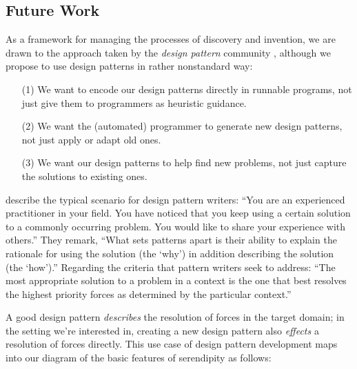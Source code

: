 \subsection{Future Work} \label{sec:futurework} \label{sec:hatching}

As a framework for managing the processes of discovery and invention,
we are drawn to the approach taken by the \emph{design pattern}
community \cite{alexander1999origins}, although we
propose to use design patterns in rather nonstandard way:
\begin{itemize}
\item[(1)] We want to encode our design patterns directly in runnable
  programs, not just give them to programmers as heuristic guidance.
\item[(2)] We want the (automated) programmer to generate new design
  patterns, not just apply or adapt old ones.
\item[(3)] We want our design patterns to help find new problems,
  not just capture the solutions to existing ones.
\end{itemize}

 describe the typical scenario for design
pattern writers: ``You are an experienced practitioner in your
field. You have noticed that you keep using a certain solution to a
commonly occurring problem. You would like to share your experience
with others.''  They remark, ``What sets patterns apart is their
ability to explain the rationale for using the solution (the `why') in
addition describing the solution (the `how').''  Regarding the
criteria that pattern writers seek to address: ``The most
appropriate solution to a problem in a context is the one that best
resolves the highest priority forces as determined by the particular
context.''  %

A good design pattern \emph{describes} the resolution of forces in the
target domain; in the setting we're interested in, creating a new
design pattern also \emph{effects} a resolution of forces directly.
This use case of design pattern development maps into our diagram of the basic features of serendipity as follows:



